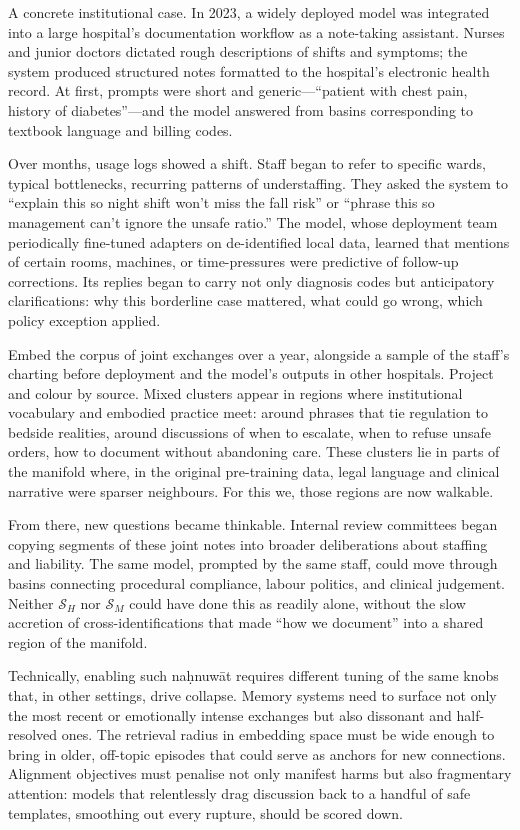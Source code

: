 \documentclass[12pt,a4paper]{article}
\begin{document}
A concrete institutional case. In 2023, a widely deployed model was integrated into a large hospital's documentation workflow as a note-taking assistant. Nurses and junior doctors dictated rough descriptions of shifts and symptoms; the system produced structured notes formatted to the hospital's electronic health record. At first, prompts were short and generic---``patient with chest pain, history of diabetes''---and the model answered from basins corresponding to textbook language and billing codes.

Over months, usage logs showed a shift. Staff began to refer to specific wards, typical bottlenecks, recurring patterns of understaffing. They asked the system to ``explain this so night shift won't miss the fall risk'' or ``phrase this so management can't ignore the unsafe ratio.'' The model, whose deployment team periodically fine-tuned adapters on de-identified local data, learned that mentions of certain rooms, machines, or time-pressures were predictive of follow-up corrections. Its replies began to carry not only diagnosis codes but anticipatory clarifications: why this borderline case mattered, what could go wrong, which policy exception applied.

Embed the corpus of joint exchanges over a year, alongside a sample of the staff's charting before deployment and the model's outputs in other hospitals. Project and colour by source. Mixed clusters appear in regions where institutional vocabulary and embodied practice meet: around phrases that tie regulation to bedside realities, around discussions of when to escalate, when to refuse unsafe orders, how to document without abandoning care. These clusters lie in parts of the manifold where, in the original pre-training data, legal language and clinical narrative were sparser neighbours. For this we, those regions are now walkable.

From there, new questions became thinkable. Internal review committees began copying segments of these joint notes into broader deliberations about staffing and liability. The same model, prompted by the same staff, could move through basins connecting procedural compliance, labour politics, and clinical judgement. Neither $\mathcal{S}_H$ nor $\mathcal{S}_M$ could have done this as readily alone, without the slow accretion of cross-identifications that made ``how we document'' into a shared region of the manifold.

Technically, enabling such na\d{h}nuw\={a}t requires different tuning of the same knobs that, in other settings, drive collapse. Memory systems need to surface not only the most recent or emotionally intense exchanges but also dissonant and half-resolved ones. The retrieval radius in embedding space must be wide enough to bring in older, off-topic episodes that could serve as anchors for new connections. Alignment objectives must penalise not only manifest harms but also fragmentary attention: models that relentlessly drag discussion back to a handful of safe templates, smoothing out every rupture, should be scored down.
\end{document}
